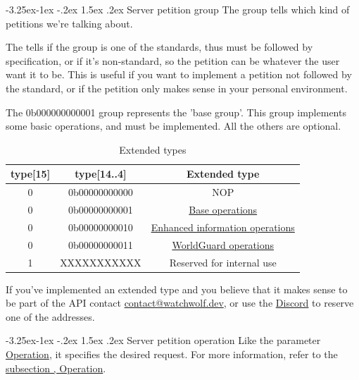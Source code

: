\documentclass[11pt]{article}
\makeatletter
\renewcommand\subsection{\@startsection{subsection}{2}{\z@}%
                                         {-3.25ex\@plus -1ex \@minus -.2ex}%
                                         {1.5ex \@plus .2ex}%
                                         {\normalfont\fontfamily{phv}\fontsize{14}{17}\bfseries}}
\makeatother
\begin{document}
\subsection{Server petition group} \label{s:server-group}
The group tells which kind of petitions we're talking about.

The  tells if the group is one of the standards, thus must be followed by specification, or if it's non-standard, so the petition can be whatever the user want it to be. This is useful if you want to implement a petition not followed by the standard, or if the petition only makes sense in your personal environment.

The 0b000000000001 group represents the 'base group'. This group implements some basic operations, and must be implemented. All the others are optional.

\begin{table}[H]
	\centering
	\begin{tabular}{ |c|c|c| }
		\hline
		type[15] & type[14..4] & Extended type \\
		\hline
		0 & 0b00000000000 & NOP\footnotemark \\
		0 & 0b00000000001 & \hyperref[g:base]{Base operations} \\
		0 & 0b00000000010 & \hyperref[g:system]{Enhanced information operations} \\
		0 & 0b00000000011 & \hyperref[g:worldguard]{WorldGuard operations} \\
		\hline
		1 &   XXXXXXXXXXX & Reserved for internal use \\
		\hline
	\end{tabular}
	\caption{Extended types}
\end{table}


If you've implemented an extended type and you believe that it makes sense to be part of the API contact \href{mailto:contact@watchwolf.dev?subject=WatchWolf - New extended type}{contact@watchwolf.dev}, or use the \href{https://discord.gg/PCD9MHRJ4W}{Discord} to reserve one of the addresses.

\subsection{Server petition operation} \label{s:server-operation}
Like the parameter \hyperref[s:operation]{Operation}, it specifies the desired request. For more information, refer to the \hyperref[s:operation]{subsection , Operation}.
\end{document}
